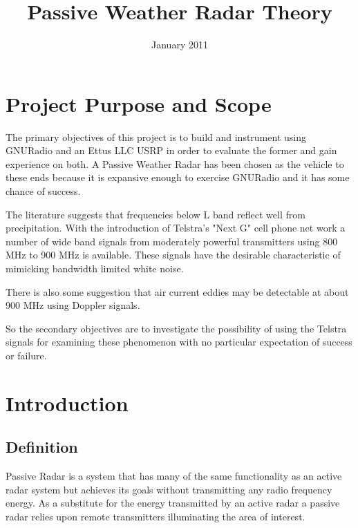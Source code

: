 \documentclass[a4paper]{report}
\title{Passive Weather Radar Theory}
\numberwithin{equation}{chapter}
\begin{document}
\maketitle
\date{January 2011}

\clearpage\setcounter{page}{1}
\thispagestyle{Contents}

\tableofcontents

\clearpage\setcounter{page}{1}
\thispagestyle{Contents}

\listoffigures

\clearpage\setcounter{page}{1}
\chapter[Project Purpose and Scope]{Project Purpose and Scope}
The primary objectives of this project is to build and instrument using GNURadio and an Ettus LLC USRP in order to evaluate the former and gain experience on both. A Passive Weather Radar has been chosen as the vehicle to these ends because it is expansive enough to exercise GNURadio and it has some chance of success.

\bigskip

The literature suggests that frequencies below L band reflect well from precipitation. With the introduction of Telstra's "Next G" cell phone net work a number of wide band signals from moderately powerful transmitters using 800 MHz to 900 MHz is available. These signals have the desirable characteristic of mimicking bandwidth limited white noise.

\bigskip

There is also some suggestion that air current eddies may be detectable at about 900 MHz using Doppler signals.

\bigskip

So the secondary objectives are to investigate the possibility of using the Telstra signals for examining these phenomenon with no particular expectation of success or failure.

\clearpage\setcounter{page}{1}
\chapter[Introduction]{Introduction}
\section{Definition}
Passive Radar is a system that has many of the same functionality as an
active radar system but achieves its goals without transmitting any
radio frequency energy. As a substitute for the energy transmitted by
an active radar a passive radar relies upon remote transmitters
illuminating the area of interest.
\end{document}
